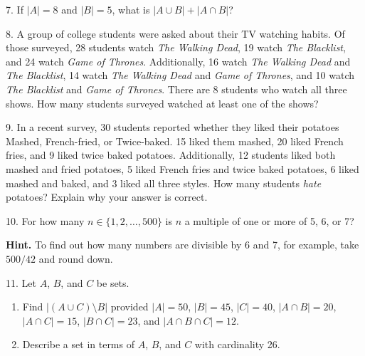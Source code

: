 \documentclass[12pt,]{book}
\theoremstyle{plain}
\theoremstyle{definition}
\theoremstyle{definition}
\theoremstyle{definition}
\numberwithin{equation}{chapter}
\newcommand{\card}[1]{\left| #1 \right|}
\begin{document}
\begin{exerciselist}
\item[7.]\hypertarget{exercise-94}{}\hypertarget{p-798}{}%
If \(\card{A} = 8\) and \(\card{B} = 5\), what is \(\card{A \cup B} + \card{A \cap B}\)?%
\par\smallskip
\item[8.]\hypertarget{exercise-95}{}\hypertarget{p-800}{}%
A group of college students were asked about their TV watching habits. Of those surveyed, 28 students watch \emph{The Walking Dead}, 19 watch \emph{The Blacklist}, and 24 watch \emph{Game of Thrones}. Additionally, 16 watch \emph{The Walking Dead} and \emph{The Blacklist}, 14 watch \emph{The Walking Dead} and \emph{Game of Thrones}, and 10 watch \emph{The Blacklist} and \emph{Game of Thrones}. There are 8 students who watch all three shows. How many students surveyed watched at least one of the shows?%
\par\smallskip
\item[9.]\hypertarget{exercise-96}{}\hypertarget{p-802}{}%
In a recent survey, 30 students reported whether they liked their potatoes Mashed, French-fried, or Twice-baked. 15 liked them mashed, 20 liked French fries, and 9 liked twice baked potatoes. Additionally, 12 students liked both mashed and fried potatoes, 5 liked French fries and twice baked potatoes, 6 liked mashed and baked, and 3 liked all three styles. How many students \emph{hate} potatoes? Explain why your answer is correct.%
\par\smallskip
\item[10.]\hypertarget{exercise-97}{}\hypertarget{p-803}{}%
For how many \(n \in \{1,2, \ldots, 500\}\) is \(n\) a multiple of one or more of 5, 6, or 7?%
\par\smallskip
\par\smallskip%
\noindent\textbf{Hint.}\hypertarget{hint-5}{}\quad%
\hypertarget{p-804}{}%
To find out how many numbers are divisible by 6 and 7, for example, take \(500/42\) and round down.%
\item[11.]\hypertarget{exercise-98}{}\hypertarget{p-805}{}%
Let \(A\), \(B\), and \(C\) be sets. \leavevmode%
\begin{enumerate}[label=(\alph*)]
\item\hypertarget{li-367}{}Find \(\card{(A \cup C)\setminus B}\) provided \(\card{A} = 50\), \(\card{B} = 45\), \(\card{C} = 40\), \(\card{A\cap B} = 20\), \(\card{A \cap C} = 15\), \(\card{B \cap C} = 23\), and \(\card{A \cap B \cap C} = 12\).%
\item\hypertarget{li-368}{}Describe a set in terms of \(A\), \(B\), and \(C\) with cardinality 26.%

\end{enumerate}
\end{exerciselist}
\end{document}
